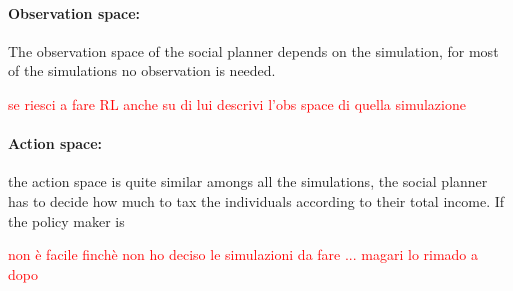 \paragraph{Observation space:} The observation space of the social planner depends on the simulation, for most of the simulations no observation is needed. 

\textcolor{red}{se riesci a fare RL anche su di lui descrivi l'obs space di quella simulazione}

\paragraph{Action space:} the action space is quite similar amongs all the simulations, the social planner has to decide how much to tax the individuals according to their total income. If the policy maker is 

\textcolor{red}{non è facile finchè non ho deciso le simulazioni da fare ... magari lo rimado a dopo}


